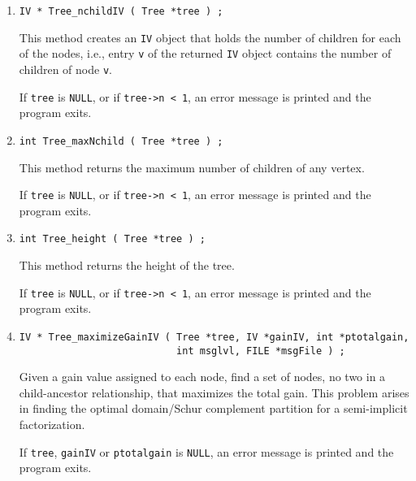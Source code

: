 \begin{enumerate}
This method returns the number of children of {\tt v}.
\par {}
If {\tt tree} is {\tt NULL}, 
or if {\tt tree->n < 1},
or {\tt v} is not in {\tt [0,tree->n-1]},
an error message is printed and the program exits.
\item
\begin{verbatim}
IV * Tree_nchildIV ( Tree *tree ) ;
\end{verbatim}
This method creates an {\tt IV} object that holds the number of
children for each of the nodes, i.e., entry {\tt v} of the returned
{\tt IV} object contains the number of children of node {\tt v}.
\par {}
If {\tt tree} is {\tt NULL},
or if {\tt tree->n < 1}, 
an error message is printed and the program exits.
\item
\begin{verbatim}
int Tree_maxNchild ( Tree *tree ) ;
\end{verbatim}
This method returns the maximum number of children of any vertex.
\par {}
If {\tt tree} is {\tt NULL},
or if {\tt tree->n < 1}, 
an error message is printed and the program exits.
\item
\begin{verbatim}
int Tree_height ( Tree *tree ) ;
\end{verbatim}
This method returns the height of the tree.
\par {}
If {\tt tree} is {\tt NULL},
or if {\tt tree->n < 1}, 
an error message is printed and the program exits.
\item
\begin{verbatim}
IV * Tree_maximizeGainIV ( Tree *tree, IV *gainIV, int *ptotalgain,
                           int msglvl, FILE *msgFile ) ;
\end{verbatim}
Given a gain value assigned to each node, 
find a set of nodes, no two in a child-ancestor relationship,
that maximizes the total gain.
This problem arises in finding the optimal domain/Schur
complement partition for a semi-implicit factorization.
\par {}
If {\tt tree}, {\tt gainIV} or {\tt ptotalgain} is {\tt NULL}, 
an error message is printed and the program exits.
\end{enumerate}

